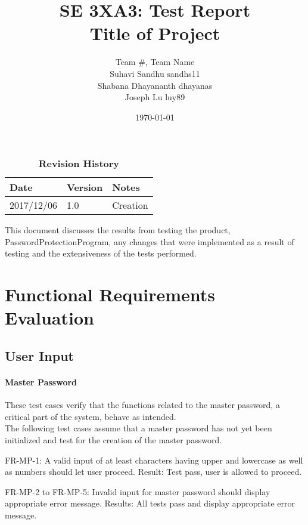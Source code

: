 \documentclass[12pt, titlepage]{article}
\title{SE 3XA3: Test Report\\Title of Project}
\author{Team \#, Team Name
		\\ Suhavi Sandhu sandhs11
		\\ Shabana Dhayananth dhayanas
		\\ Joseph Lu luy89
}
\date{\today}
\begin{document}
\maketitle

\tableofcontents
\listoftables
\listoffigures

\begin{table}[bp]
\caption{\bf Revision History}
\begin{tabularx}{\textwidth}{p{3cm}p{2cm}X}
\toprule {\bf Date} & {\bf Version} & {\bf Notes}\\
\midrule
2017/12/06 & 1.0 & Creation\\
\bottomrule
\end{tabularx}
\end{table}

\newpage


This document discusses the results from testing the product, PasswordProtectionProgram, 
any changes that were implemented as a result of testing and the extensiveness of the 
tests performed.

\section{Functional Requirements Evaluation}

\subsection{User Input}

\paragraph{Master Password}
These test cases verify that the functions related to the master password, a critical part of 
the system, behave as intended.  
\newline
\\
	The following test cases assume that a master password has not yet been initialized and test for the creation of the master password.

	FR-MP-1: A valid input of at least characters having upper and lowercase as well as numbers should let user proceed.
	Result: Test pass, user is allowed to proceed.
	
	FR-MP-2 to FR-MP-5: Invalid input for master password should display appropriate error message.
	Results: All tests pass and display appropriate error message.
	
\end{document}
